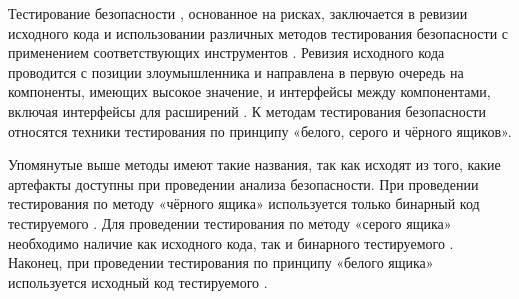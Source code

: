 %
Тестирование безопасности , основанное на рисках, заключается в ревизии 
исходного кода и использовании различных методов тестирования безопасности с применением 
соответствующих инструментов . 
%
Ревизия исходного кода проводится с позиции злоумышленника и направлена в первую очередь 
на компоненты, имеющих высокое значение, и интерфейсы между компонентами, включая интерфейсы 
для расширений . 
%
К методам тестирования безопасности относятся техники тестирования по принципу «белого, серого и 
чёрного ящиков».

%
Упомянутые выше методы имеют такие названия, так как исходят из того, какие артефакты 
 доступны при проведении анализа безопасности. 
%
При проведении тестирования  по методу «чёрного ящика» используется только 
бинарный код тестируемого . 
%
Для проведении тестирования  по методу «серого ящика» необходимо наличие 
как исходного кода, так и бинарного тестируемого . 
%
Наконец, при проведении тестирования  по принципу «белого ящика» 
используется исходный код тестируемого .